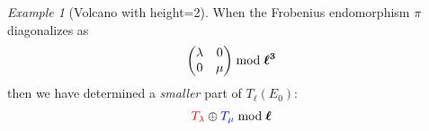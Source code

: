 \documentclass[10pt,a4paper]{beamer}
\theoremstyle{plain}
\theoremstyle{definition}
\theoremstyle{definition}
\theoremstyle{definition}
\theoremstyle{definition}
\theoremstyle{remark}
\theoremstyle{remark}
\newtheorem{exe}[thm]{Example}
\begin{document}
\begin{frame}
\begin{columns}
\begin{column}{7cm}
\begin{figure}[h]
\begin{center}
		\end{center} 
		\end{figure}
\end{column}
\end{columns}
\end{frame}

\begin{frame}
\begin{columns}

\begin{column}{4cm}
\begin{exe}[Volcano with height=2]
When the Frobenius endomorphism $\pi$ diagonalizes as
\[
\left( \begin{matrix}
\lambda & 0 \\
0 & \mu 
\end{matrix} \right) \bmod \textit{\boldmath  $\ell^3$ \unboldmath } 
\]
then we have determined a \emph{smaller} part of $T_{\ell}(E_0)$:
\[
\color{red}T_{\lambda} \color{black} \oplus \color{blue} T_{\mu} \color{black} \bmod \textit{\boldmath  $\ell$ \unboldmath }
\]
\end{exe}
\end{column}


\end{columns}
\end{frame}
\end{document}
